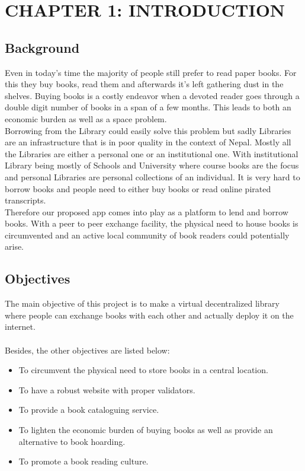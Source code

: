 \documentclass[12pt]{article}
\begin{document}
\clearpage
\thispagestyle{empty}
\tableofcontents

\clearpage
\thispagestyle{empty}
\listoffigures

\clearpage
{}
\section{CHAPTER 1: INTRODUCTION}

\subsection{Background}
Even in today’s time the majority of people still prefer to read paper books. For 
this they buy books, read them and afterwards it’s left gathering dust in the 
shelves. Buying books is a costly endeavor when a devoted reader goes through a 
double digit number of books in a span of a few months. This leads to both an 
economic burden as well as a space problem.
\\
Borrowing from the Library could easily solve this problem but sadly Libraries are 
an infrastructure that is in poor quality in the context of Nepal. Mostly all the 
Libraries are either a personal one or an institutional one. With institutional 
Library being mostly of Schools and University where course books are the focus and 
personal Libraries are personal collections of an individual. It is very hard to 
borrow books and people need to either buy books or read online pirated transcripts.
\\
Therefore our proposed app comes into play as a platform to lend and borrow books. 
With a peer to peer exchange facility, the physical need to house books is 
circumvented and an active local community of book readers could potentially arise.

\vspace*{5mm}
\subsection{Objectives}
The main objective of this project is to make a virtual decentralized library where 
people can exchange books with each other and actually deploy it on the internet.
\\\\
Besides, the other objectives are listed below:
\begin{itemize}
    \item To circumvent the physical need to store books in a central location.
    \item To have a robust website with proper validators.
    \item To provide a book cataloguing service.
    \item To lighten the economic burden of buying books as well as provide an alternative to book hoarding.
    \item To promote a book reading culture.
\end{itemize}
\end{document}
